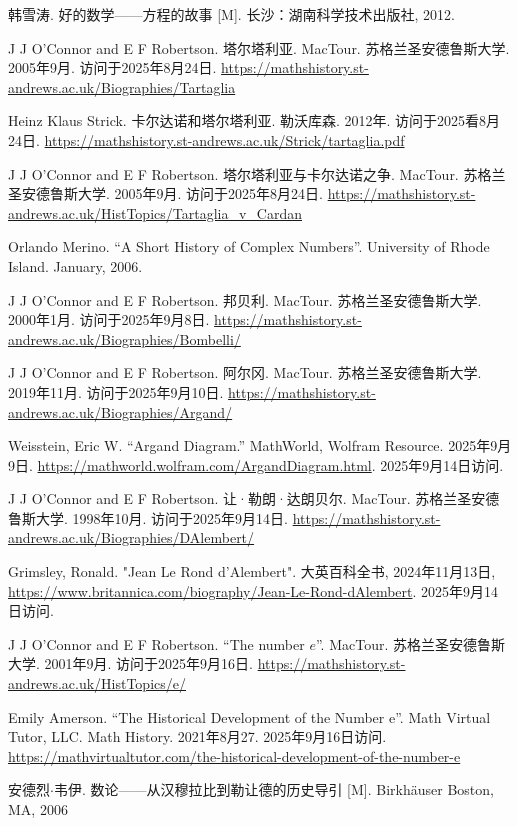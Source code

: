 韩雪涛. 好的数学——方程的故事 [M]. 长沙：湖南科学技术出版社, 2012. %

J J O'Connor and E F Robertson. 塔尔塔利亚. MacTour. 苏格兰圣安德鲁斯大学. 2005年9月. 访问于2025年8月24日. \url{https://mathshistory.st-andrews.ac.uk/Biographies/Tartaglia}

Heinz Klaus Strick. 卡尔达诺和塔尔塔利亚. 勒沃库森. 2012年. 访问于2025看8月24日. \url{https://mathshistory.st-andrews.ac.uk/Strick/tartaglia.pdf}

J J O'Connor and E F Robertson. 塔尔塔利亚与卡尔达诺之争. MacTour. 苏格兰圣安德鲁斯大学. 2005年9月. 访问于2025年8月24日. \url{https://mathshistory.st-andrews.ac.uk/HistTopics/Tartaglia_v_Cardan} %

Orlando Merino. ``A Short History of Complex Numbers''. University of Rhode Island. January, 2006.

J J O'Connor and E F Robertson. 邦贝利. MacTour. 苏格兰圣安德鲁斯大学. 2000年1月. 访问于2025年9月8日. \url{https://mathshistory.st-andrews.ac.uk/Biographies/Bombelli/}

J J O'Connor and E F Robertson. 阿尔冈. MacTour. 苏格兰圣安德鲁斯大学. 2019年11月. 访问于2025年9月10日. \url{https://mathshistory.st-andrews.ac.uk/Biographies/Argand/}

Weisstein, Eric W. ``Argand Diagram.'' MathWorld, Wolfram Resource. 2025年9月9日. \url{https://mathworld.wolfram.com/ArgandDiagram.html}. 2025年9月14日访问.

J J O'Connor and E F Robertson. 让·勒朗·达朗贝尔. MacTour. 苏格兰圣安德鲁斯大学. 1998年10月. 访问于2025年9月14日. \url{https://mathshistory.st-andrews.ac.uk/Biographies/DAlembert/}

Grimsley, Ronald. "Jean Le Rond d’Alembert". 大英百科全书, 2024年11月13日, \url{https://www.britannica.com/biography/Jean-Le-Rond-dAlembert}. 2025年9月14日访问.

J J O'Connor and E F Robertson. ``The number $e$''. MacTour. 苏格兰圣安德鲁斯大学. 2001年9月. 访问于2025年9月16日. \url{https://mathshistory.st-andrews.ac.uk/HistTopics/e/}

Emily Amerson. ``The Historical Development of the Number e''. Math Virtual Tutor, LLC. Math History. 2021年8月27. 2025年9月16日访问. \url{https://mathvirtualtutor.com/the-historical-development-of-the-number-e}

安德烈$\cdot$韦伊. 数论——从汉穆拉比到勒让德的历史导引 [M]. Birkhäuser Boston, MA, 2006 %
